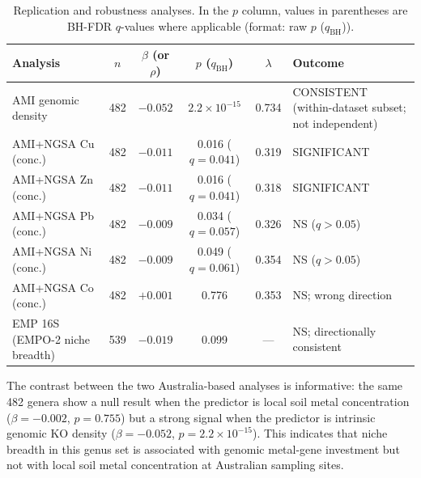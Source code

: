 \documentclass[times]{zHenriquesLab-StyleBioRxiv}
\begin{document}
\begin{table}[htbp]
\caption{Replication and robustness analyses. In the $p$ column, values in parentheses
are BH-FDR $q$-values where applicable (format: raw $p$ ($q_{\mathrm{BH}}$)).}
\label{tab:6}
\centering
\small
\begin{tabular}{lcccc p{4cm}}
\toprule
Analysis & $n$ & $\beta$ (or $\rho$) & $p$ ($q_{\mathrm{BH}}$) & $\lambda$ & Outcome \\
\midrule
AMI genomic density & 482 & $\mathbf{-0.052}$ & $2.2 \times 10^{-15}$
  & 0.734 & CONSISTENT (within-dataset subset; not independent) \\
AMI+NGSA Cu (conc.) & 482 & $-0.011$
  & 0.016 ($q = 0.041$) & 0.319 & SIGNIFICANT \\
AMI+NGSA Zn (conc.) & 482 & $-0.011$
  & 0.016 ($q = 0.041$) & 0.318 & SIGNIFICANT \\
AMI+NGSA Pb (conc.) & 482 & $-0.009$
  & 0.034 ($q = 0.057$) & 0.326 & NS ($q > 0.05$) \\
AMI+NGSA Ni (conc.) & 482 & $-0.009$
  & 0.049 ($q = 0.061$) & 0.354 & NS ($q > 0.05$) \\
AMI+NGSA Co (conc.) & 482 & $+0.001$ & 0.776 & 0.353
  & NS; wrong direction \\
EMP 16S (EMPO-2 niche breadth) & 539 & $-0.019$ & 0.099 & ---
  & NS; directionally consistent \\
\bottomrule
\end{tabular}
\end{table}

The contrast between the two Australia-based analyses is informative: the same
482 genera show a null result when the predictor is local soil metal
concentration ($\beta = -0.002$, $p = 0.755$) but a strong signal when the
predictor is intrinsic genomic KO density ($\beta = -0.052$,
$p = 2.2 \times 10^{-15}$). This indicates that niche breadth in this genus set
is associated with genomic metal-gene investment but not with local soil metal
concentration at Australian sampling sites.




\end{document}
